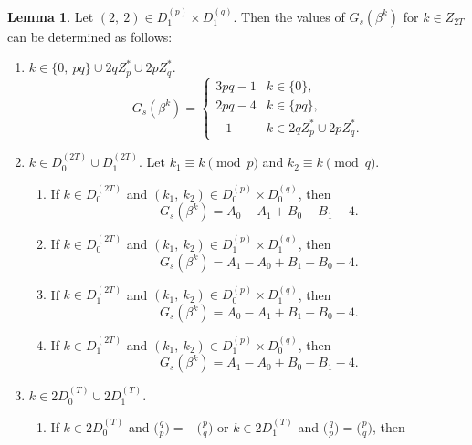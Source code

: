 \documentclass{mcom-l}
\theoremstyle{definition}
\newtheorem{sec3lemma9}[sec3lemma1]{Lemma}
\numberwithin{equation}{section}
\begin{document}
  \begin{sec3lemma9}\label{lab_sec3_lemma9}
  Let $ (2,\ 2)\in D_{1}^{(p)}\times D_{1}^{(q)}$. Then the values of $ G_{s}(\beta^{k}) $ for $ k\in Z_{2T} $ can be determined as follows:
  \begin{enumerate} \item $ k\in \lbrace 0,\ pq \rbrace \cup 2qZ^{*}_{p}\cup 2pZ^{*}_{q} $.
  \begin{equation*}
  G_{s}(\beta^{k})=
  \begin{cases}
  3pq-1&k\in\lbrace 0\rbrace,\\
  2pq-4&k\in\lbrace pq\rbrace,\\
  -1   &k\in 2qZ^{*}_{p}\cup 2pZ^{*}_{q}.
  \end{cases}
  \end{equation*}
  \item $ k\in D_{0}^{(2T)}\cup D_{1}^{(2T)} $. Let  $ k_{1}\equiv k\pmod p $ and $ k_{2}\equiv k\pmod q $.
  \begin{enumerate}
  \item
  If $ k\in D_{0}^{(2T)} $ and $ (k_{1},\ k_{2})\in D^{(p)}_{0}\times D^{(q)}_{0} $, then
  \begin{equation*}
  G_{s}(\beta^{k})=A_{0}-A_{1}+B_{0}-B_{1}-4.
  \end{equation*} 
  \item
  If $ k\in D_{0}^{(2T)} $ and $ (k_{1},\ k_{2})\in D^{(p)}_{1}\times D^{(q)}_{1} $, then
  \begin{equation*}
  G_{s}(\beta^{k})=A_{1}-A_{0}+B_{1}-B_{0}-4.
  \end{equation*}
  \item
  If $ k\in D_{1}^{(2T)} $ and $ (k_{1},\ k_{2})\in D^{(p)}_{0}\times D^{(q)}_{1} $, then
  \begin{equation*}
  G_{s}(\beta^{k})=A_{0}-A_{1}+B_{1}-B_{0}-4.
  \end{equation*} 
  \item
  If $ k\in D_{1}^{(2T)} $ and $ (k_{1},\ k_{2})\in D^{(p)}_{1}\times D^{(q)}_{0} $, then
  \begin{equation*}
  G_{s}(\beta^{k})=A_{1}-A_{0}+B_{0}-B_{1}-4.
  \end{equation*}  
  \end{enumerate}
  \item $ k\in 2D_{0}^{(T)}\cup 2D_{1}^{(T)} $.
  \begin{enumerate}
  \item
  If $ k\in 2D_{0}^{(T)} $ and $ \biggl(\frac{q}{p}\biggr)=-\biggl(\frac{p}{q}\biggr) $ or $ k\in 2D_{1}^{(T)} $ and $ \biggl(\frac{q}{p}\biggr)=\biggl(\frac{p}{q}\biggr) $, then

\end{enumerate}
\end{enumerate}
\end{sec3lemma9}
\end{document}
